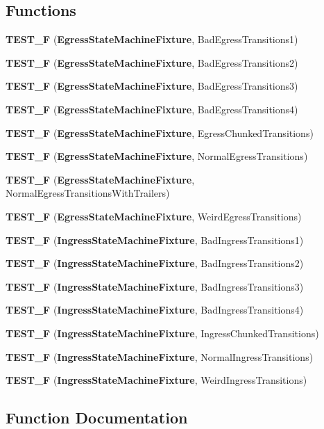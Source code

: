 \subsection*{Functions}
\begin{DoxyCompactItemize}
\item 
{\bf T\+E\+S\+T\+\_\+F} ({\bf Egress\+State\+Machine\+Fixture}, Bad\+Egress\+Transitions1)
\item 
{\bf T\+E\+S\+T\+\_\+F} ({\bf Egress\+State\+Machine\+Fixture}, Bad\+Egress\+Transitions2)
\item 
{\bf T\+E\+S\+T\+\_\+F} ({\bf Egress\+State\+Machine\+Fixture}, Bad\+Egress\+Transitions3)
\item 
{\bf T\+E\+S\+T\+\_\+F} ({\bf Egress\+State\+Machine\+Fixture}, Bad\+Egress\+Transitions4)
\item 
{\bf T\+E\+S\+T\+\_\+F} ({\bf Egress\+State\+Machine\+Fixture}, Egress\+Chunked\+Transitions)
\item 
{\bf T\+E\+S\+T\+\_\+F} ({\bf Egress\+State\+Machine\+Fixture}, Normal\+Egress\+Transitions)
\item 
{\bf T\+E\+S\+T\+\_\+F} ({\bf Egress\+State\+Machine\+Fixture}, Normal\+Egress\+Transitions\+With\+Trailers)
\item 
{\bf T\+E\+S\+T\+\_\+F} ({\bf Egress\+State\+Machine\+Fixture}, Weird\+Egress\+Transitions)
\item 
{\bf T\+E\+S\+T\+\_\+F} ({\bf Ingress\+State\+Machine\+Fixture}, Bad\+Ingress\+Transitions1)
\item 
{\bf T\+E\+S\+T\+\_\+F} ({\bf Ingress\+State\+Machine\+Fixture}, Bad\+Ingress\+Transitions2)
\item 
{\bf T\+E\+S\+T\+\_\+F} ({\bf Ingress\+State\+Machine\+Fixture}, Bad\+Ingress\+Transitions3)
\item 
{\bf T\+E\+S\+T\+\_\+F} ({\bf Ingress\+State\+Machine\+Fixture}, Bad\+Ingress\+Transitions4)
\item 
{\bf T\+E\+S\+T\+\_\+F} ({\bf Ingress\+State\+Machine\+Fixture}, Ingress\+Chunked\+Transitions)
\item 
{\bf T\+E\+S\+T\+\_\+F} ({\bf Ingress\+State\+Machine\+Fixture}, Normal\+Ingress\+Transitions)
\item 
{\bf T\+E\+S\+T\+\_\+F} ({\bf Ingress\+State\+Machine\+Fixture}, Weird\+Ingress\+Transitions)
\end{DoxyCompactItemize}


\subsection{Function Documentation}
